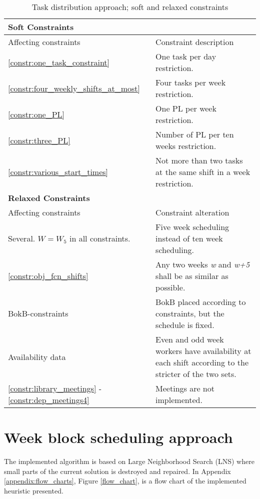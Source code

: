 \begin{table}[!h]
\centering
\caption{Task distribution approach; soft and relaxed constraints}
\label{tab:task_constraints}
\begin{tabular}{|p{4cm}|p{7cm}|}
\hline
\multicolumn{2}{|l|}{\cellcolor{gray!90} \textbf{Soft Constraints}} \\
\hline 
\rowcolor{Gray} Affecting constraints & Constraint description \\ \hline
\ref{constr:one_task_constraint} & One task per day restriction.  \\ \hline
\ref{constr:four_weekly_shifts_at_most} & Four tasks per week restriction. \\ \hline
\ref{constr:one_PL} & One PL per week restriction. \\ \hline
\ref{constr:three_PL} & Number of PL per ten weeks restriction. \\ \hline
\ref{constr:various_start_times} & Not more than two tasks at the same shift in a week restriction.  \\ \hline
\multicolumn{2}{|l|}{\cellcolor{gray!90} \textbf{Relaxed Constraints}} \\
\hline 
\rowcolor{Gray} Affecting constraints & Constraint alteration \\ \hline
Several. $W = W_5$ in all constraints. & Five week scheduling instead of ten week scheduling. \\ \hline
\ref{constr:obj_fcn_shifts} & Any two weeks \textit{w} and \textit{w+5} shall be as similar as possible. \\ \hline
BokB-constraints & BokB placed according to constraints, but the schedule is fixed. \\ \hline
Availability data & Even and odd week workers have availability at each shift according to the stricter of the two sets. \\ \hline
\ref{constr:library_meetings} - \ref{constr:dep_meetings4} & Meetings are not implemented. \\ \hline
\end{tabular}
\end{table}

\section{Week block scheduling approach}

The implemented algorithm is based on Large Neighborhood Search (LNS) where small parts of the current solution is destroyed and repaired. In Appendix \ref{appendix:flow_charts}, Figure \ref{flow_chart}, is a flow chart of the implemented heuristic presented. 


